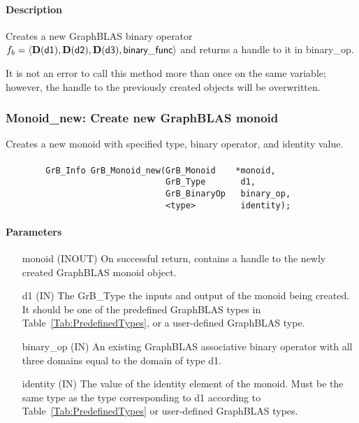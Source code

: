 \paragraph{Description}

Creates a new GraphBLAS binary operator $f_b = \langle \bold{D}({\sf d1}), 
\bold{D}({\sf d2}), \bold{D}({\sf d3}), {\sf binary\_func} \rangle$ and returns
a handle to it in {\sf binary\_op}.

It is not an error to call this method more than once on the same variable;  
however, the handle to the previously created objects will be overwritten. 


\subsubsection{{\sf Monoid\_new}: Create new GraphBLAS monoid}

Creates a new monoid with specified type, binary operator, and identity value.

\paragraph{\syntax}

\begin{verbatim}
        GrB_Info GrB_Monoid_new(GrB_Monoid    *monoid,
                                GrB_Type       d1,
                                GrB_BinaryOp   binary_op,
                                <type>         identity);
\end{verbatim}

\paragraph{Parameters}

\begin{itemize}[leftmargin=1.1in]
    \item[{\sf monoid}] ({\sf INOUT}) On successful return, contains a
    handle to the newly created GraphBLAS monoid object.
    \item[{\sf d1}] ({\sf IN}) The {\sf GrB\_Type} the inputs and output of the 
    monoid being created. It should be one of the predefined GraphBLAS types in
    Table~\ref{Tab:PredefinedTypes}, or a user-defined GraphBLAS type.
    \item[{\sf binary\_op}] ({\sf IN}) An existing GraphBLAS associative binary operator with all three domains equal to the domain of type {\sf d1}.
    \item[{\sf identity}]  ({\sf IN}) The value of the identity element of the 
    monoid. Must be the same type as the type corresponding to {\sf d1} according to
    Table~\ref{Tab:PredefinedTypes} or user-defined GraphBLAS types.
\end{itemize}

